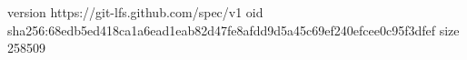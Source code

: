 version https://git-lfs.github.com/spec/v1
oid sha256:68edb5ed418ca1a6ead1eab82d47fe8afdd9d5a45c69ef240efcee0c95f3dfef
size 258509
